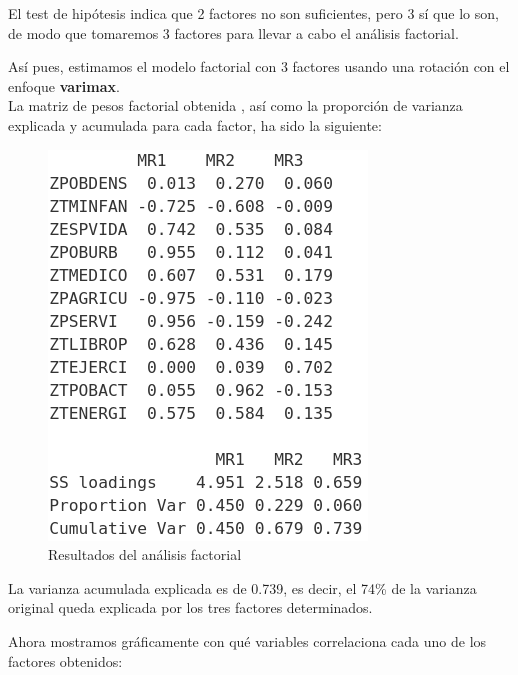 \documentclass[11pt,a4paper]{article}
\begin{document}
    El test de hipótesis indica que 2 factores no son suficientes, pero 3 sí que lo son, de modo que tomaremos 3 factores para llevar a cabo el análisis factorial.
    
    Así pues, estimamos el modelo factorial con 3 factores usando una rotación con el enfoque \textbf{varimax}. \\ 
    
    La matriz de pesos factorial obtenida , así como la proporción de varianza explicada y acumulada para cada factor,  ha sido la siguiente:
    
                 \begin{figure}[H]
    	    \centering
    	    \includegraphics[scale=0.5]{af.png}
    	    \caption{Resultados del análisis factorial}
    	    \label{af}
    	\end{figure}
    	
    La varianza acumulada explicada es de 0.739, es decir, el 74\% de la varianza original queda explicada por los tres factores determinados. 
    

    Ahora mostramos gráficamente con qué variables correlaciona cada uno de los factores obtenidos: 
    
\end{document}
